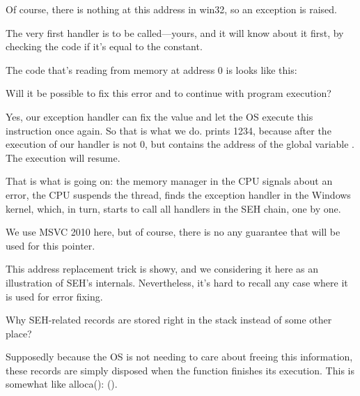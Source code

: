 Of course, there is nothing at this address in win32, so an exception is raised.

The very first handler is to be called---yours, and it will know about it first, by checking
the code if it's equal to the  constant.

The code that's reading from memory at address 0 is looks like this:



Will it be possible to fix this error  and to continue with program execution?

Yes, our exception handler can fix the \EAX value and let the \ac{OS} execute this instruction once again.
So that is what we do. \printf prints 1234, because after the execution of our handler \EAX is not 0,
but contains the address of the global variable .
The execution will resume.

That is what is going on: the memory manager in the \ac{CPU} signals about an error, the \ac{CPU} suspends the thread,
finds the exception handler in the Windows kernel, 
which, in turn, starts to call all handlers in the \ac{SEH} chain, one by one.

We use MSVC 2010 here, but of course, there is no any guarantee that \EAX will be used for this pointer.

This address replacement trick is showy, and we considering it here as an illustration of \ac{SEH}'s internals.
Nevertheless, it's hard to recall any case where it is used for  error fixing.

Why SEH-related records are stored right in the stack instead of some other place?

Supposedly because the \ac{OS} is not needing to care about freeing this information, 
these records are simply disposed when the function finishes its execution.
This is somewhat like alloca(): ().

